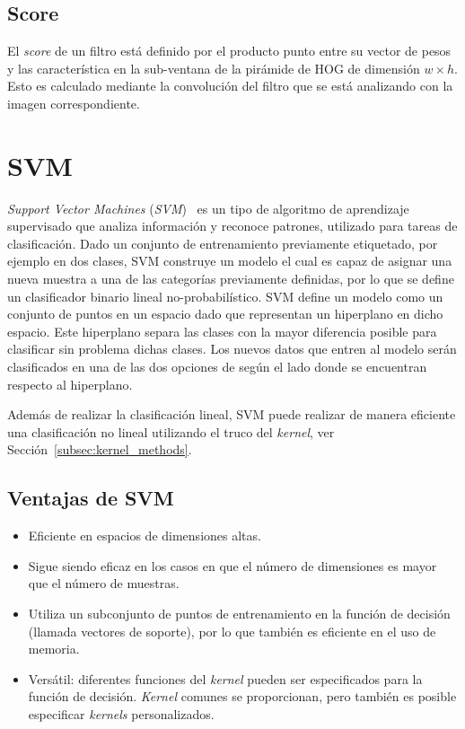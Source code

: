 \subsection{Score}
El \textit{score} de un filtro está definido por el producto punto entre su vector de pesos y las característica en la sub-ventana de la pirámide de HOG de dimensión $w \times h$. Esto es calculado mediante la convolución del filtro que se está analizando con la imagen correspondiente.
\section{SVM}\label{sec:lsvm}

\textit{Support Vector Machines} (\textit{SVM})~\cite{Vapnik1995, Duda2000, Cortes1995} es un tipo de algoritmo de aprendizaje supervisado que analiza información y reconoce patrones, utilizado para tareas de clasificación. Dado un conjunto de entrenamiento previamente etiquetado, por ejemplo en dos clases, SVM construye un modelo el cual es capaz de asignar una nueva muestra a una de las categorías previamente definidas, por lo que se define un clasificador binario lineal no-probabilístico.
SVM define un modelo como un conjunto de puntos en un espacio dado que representan un hiperplano en dicho espacio. Este hiperplano separa las clases con la mayor diferencia posible para clasificar sin problema dichas clases. Los nuevos datos que entren al modelo serán clasificados en una de las dos opciones de según el lado donde se encuentran respecto al hiperplano.

Además de realizar la clasificación lineal, SVM puede realizar de manera eficiente una clasificación no lineal utilizando el truco del \textit{kernel}, ver Sección~\ref{subsec:kernel_methods}.

\subsection{Ventajas de SVM}
\begin{itemize}
\item Eficiente en espacios de dimensiones altas.
\item Sigue siendo eficaz en los casos en que el número de dimensiones es mayor que el número de muestras.
\item Utiliza un subconjunto de puntos de entrenamiento en la función de decisión (llamada vectores de soporte), por lo que también es eficiente en el uso de memoria.
\item Versátil: diferentes funciones del \textit{kernel} pueden ser especificados para la función de decisión. \textit{Kernel} comunes se proporcionan, pero también es posible especificar \textit{kernels} personalizados.
\end{itemize}

